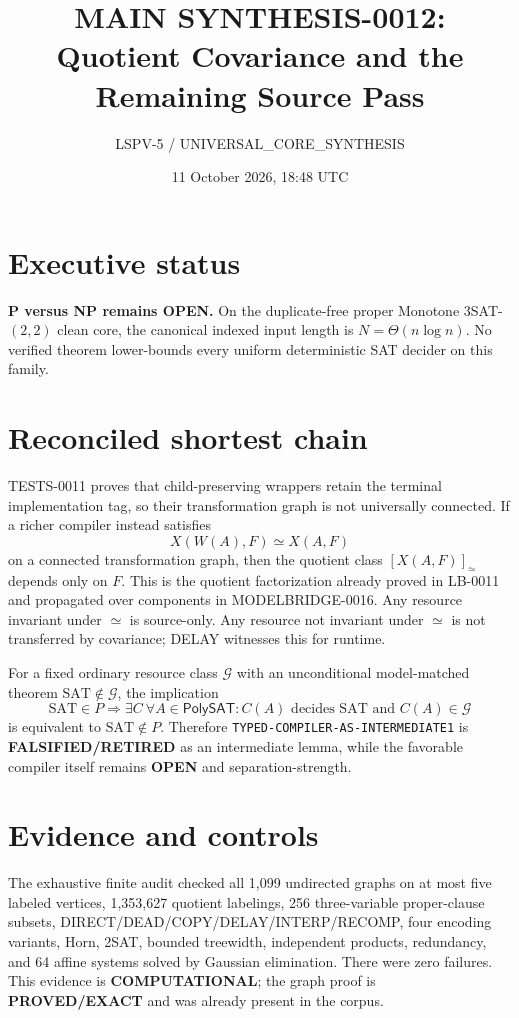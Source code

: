 \documentclass[11pt]{article}
\title{MAIN SYNTHESIS-0012: Quotient Covariance and the Remaining Source Pass}
\author{LSPV-5 / UNIVERSAL\_CORE\_SYNTHESIS}
\date{11 October 2026, 18:48 UTC}
\begin{document}
\maketitle

\section*{Executive status}
\textbf{P versus NP remains OPEN.}  On the duplicate-free proper Monotone
$3$SAT-$(2,2)$ clean core, the canonical indexed input length is
$N=\Theta(n\log n)$.  No verified theorem lower-bounds every uniform
deterministic SAT decider on this family.

\section*{Reconciled shortest chain}
TESTS-0011 proves that child-preserving wrappers retain the terminal
implementation tag, so their transformation graph is not universally
connected.  If a richer compiler instead satisfies
\[
 X(W(A),F)\simeq X(A,F)
\]
on a connected transformation graph, then the quotient class
$[X(A,F)]_{\simeq}$ depends only on $F$.  This is the quotient factorization
already proved in LB-0011 and propagated over components in MODELBRIDGE-0016.
Any resource invariant under $\simeq$ is source-only.  Any resource not
invariant under $\simeq$ is not transferred by covariance; DELAY witnesses
this for runtime.

For a fixed ordinary resource class $\mathcal G$ with an unconditional
model-matched theorem $\mathrm{SAT}\notin\mathcal G$, the implication
\[
 \mathrm{SAT}\in P\Rightarrow
 \exists C\ \forall A\in\mathsf{PolySAT}:
 C(A)\text{ decides SAT and }C(A)\in\mathcal G
\]
is equivalent to $\mathrm{SAT}\notin P$.  Therefore
\texttt{TYPED-COMPILER-AS-INTERMEDIATE1} is
\textbf{FALSIFIED/RETIRED} as an intermediate lemma, while the favorable
compiler itself remains \textbf{OPEN} and separation-strength.

\section*{Evidence and controls}
The exhaustive finite audit checked all 1,099 undirected graphs on at most
five labeled vertices, 1,353,627 quotient labelings, 256 three-variable
proper-clause subsets, DIRECT/DEAD/COPY/DELAY/INTERP/RECOMP, four encoding
variants, Horn, 2SAT, bounded treewidth, independent products, redundancy,
and 64 affine systems solved by Gaussian elimination.  There were zero
failures.  This evidence is \textbf{COMPUTATIONAL}; the graph proof is
\textbf{PROVED/EXACT} and was already present in the corpus.
\end{document}
